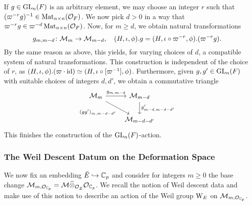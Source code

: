 \documentclass[../main.tex]{subfiles}
\begin{document}
If $g \in \operatorname{GL}_n(F)$ is an arbitrary element, we may choose an integer $r$ such
that $(\varpi^{-r} g)^{-1} \in \operatorname{Mat}_{n \times n}(\mathcal{O}_F)$. We now pick 
$d > 0$ in a way that $\varpi^{-r}g \in \varpi^{-d}\operatorname{Mat}_{n \times n}(\mathcal{O}_F)$. 
Now, for $m \geq d$, we obtain natural transformations
\begin{equation*}
  g_{m,m-d}\colon \mathcal{M}_{m} \to \mathcal{M}_{m-d}, \quad (H, \iota, \phi).g = (H, \iota \circ \varpi^{-r}, \phi).(\varpi^{-r}g).
\end{equation*}
By the same reason as above, this yields, for varying choices of $d$, a
compatible system of natural transformations.
This construction is independent of the choice of $r$, as $(H, \iota,
\phi).(\varpi\cdot\operatorname{id}) \simeq (H, \iota \circ [\varpi^{-1}], \phi)$.
Furthermore, given $g, g' \in \operatorname{GL}_n(F)$ with suitable choices of integers 
$d, d'$, we obtain a commutative triangle
\begin{equation*}
\begin{tikzcd}[ampersand replacement=\&]
	{\cM_{m}} \& {\cM_{m-d}} \\
	\& {\cM_{m-d-d'}}
	\arrow["{g_{m,m-d}}", from=1-1, to=1-2]
	\arrow["{(gg')_{m,m-d-d'}}"', from=1-1, to=2-2]
	\arrow["{g'_{m-d,m-d-d'}}", from=1-2, to=2-2]
\end{tikzcd}
\end{equation*}
This finishes the construction of the $\operatorname{GL}_n(F)$-action.


\subsubsection{The Weil Descent Datum on the Deformation Space} %
\label{ssub:The Weil Descent Datum}
We now fix an embedding ${\breve {E}} \hookrightarrow \mathbb{C}_p$ and consider for integers $m \geq 0$ the
base change $\mathcal{M}_{m, \mathcal{O}_{\mathbb{C}_p}} = \mathcal{M} \widehat \otimes_{\mathcal{O}_{\breve {E}}} \mathcal{O}_{\mathbb{C}_p}$. 
We recall the notion of Weil descent data and make use of this notion to describe
an action of the Weil group $\mathrm W_E$ on $\mathcal{M}_{m, \mathcal{O}_{\mathbb{C}_p}}$.
\end{document}
